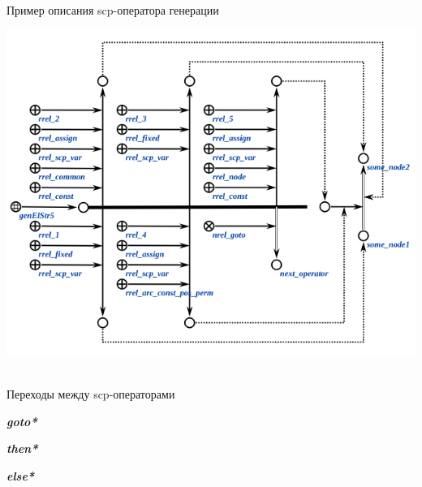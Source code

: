 \begin{frame}{\\Пример описания scp-оператора генерации}
	\topline
	\justifying
	
	\vspace{10mm}
	
	\begin{center}
		\includegraphics[scale=0.5]{figures/sd_scp/genElStr5_fafaa_2.png}
	\end{center}
	
\end{frame}

\begin{frame}{\\Переходы между scp-операторами}
	\topline
	\justifying
	
	\begin{textitemize}
		\item \textbf{\textit{goto*}}
		\item \textbf{\textit{then*}}
		\item \textbf{\textit{else*}}
	\end{textitemize}
	
\end{frame}

